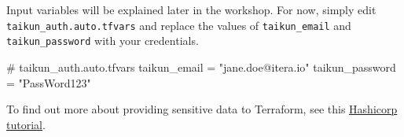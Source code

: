 Input variables will be explained later in the workshop.
For now, simply edit \texttt{taikun\_auth.auto.tfvars}
and replace the values of \texttt{taikun\_email} and \texttt{taikun\_password}
with your credentials.
\begin{tf}
# taikun_auth.auto.tfvars
taikun_email = "jane.doe@itera.io"
taikun_password = "PassWord123"
\end{tf}
To find out more about providing sensitive data to Terraform, see this \href{https://learn.hashicorp.com/tutorials/terraform/sensitive-variables}{Hashicorp tutorial}.
